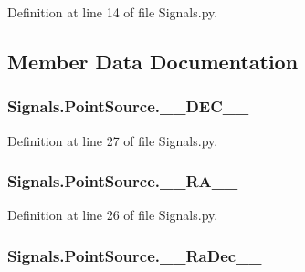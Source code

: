 Definition at line 14 of file Signals.\+py.



\subsection{Member Data Documentation}
\subsubsection[{\texorpdfstring{\+\_\+\+\_\+\+D\+E\+C\+\_\+\+\_\+}{__DEC__}}]{\setlength{\rightskip}{0pt plus 5cm}Signals.\+Point\+Source.\+\_\+\+\_\+\+D\+E\+C\+\_\+\+\_\+\hspace{0.3cm}{\ttfamily [private]}}\hypertarget{classSignals_1_1PointSource_a47e98573bcf62bb6e80f1bcbbdb79620}{}\label{classSignals_1_1PointSource_a47e98573bcf62bb6e80f1bcbbdb79620}


Definition at line 27 of file Signals.\+py.

\subsubsection[{\texorpdfstring{\+\_\+\+\_\+\+R\+A\+\_\+\+\_\+}{__RA__}}]{\setlength{\rightskip}{0pt plus 5cm}Signals.\+Point\+Source.\+\_\+\+\_\+\+R\+A\+\_\+\+\_\+\hspace{0.3cm}{\ttfamily [private]}}\hypertarget{classSignals_1_1PointSource_ab452ac8a968d9ac8759cb95f60424932}{}\label{classSignals_1_1PointSource_ab452ac8a968d9ac8759cb95f60424932}


Definition at line 26 of file Signals.\+py.

\subsubsection[{\texorpdfstring{\+\_\+\+\_\+\+Ra\+Dec\+\_\+\+\_\+}{__RaDec__}}]{\setlength{\rightskip}{0pt plus 5cm}Signals.\+Point\+Source.\+\_\+\+\_\+\+Ra\+Dec\+\_\+\+\_\+\hspace{0.3cm}{\ttfamily [private]}}\hypertarget{classSignals_1_1PointSource_ac876dc0b41dd3da6bb9b8ec9c41e0dd2}{}\label{classSignals_1_1PointSource_ac876dc0b41dd3da6bb9b8ec9c41e0dd2}


